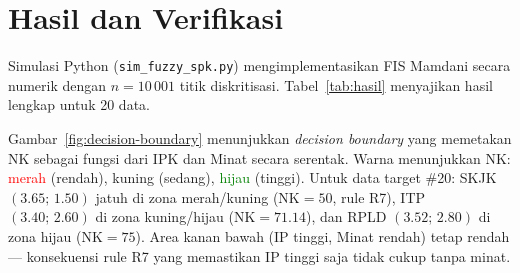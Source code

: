 \documentclass[conference]{IEEEtran}
\begin{document}
\section{Hasil dan Verifikasi}
\label{sec:hasil}

Simulasi Python (\texttt{sim\_fuzzy\_spk.py}) mengimplementasikan FIS
Mamdani secara numerik dengan $n=10\,001$ titik diskritisasi.
Tabel~\ref{tab:hasil} menyajikan hasil lengkap untuk 20 data.

Gambar~\ref{fig:decision-boundary} menunjukkan \emph{decision boundary}
yang memetakan NK sebagai fungsi dari IPK dan Minat secara serentak.
Warna menunjukkan NK: \textcolor{red}{merah} (rendah), kuning (sedang),
\textcolor{green}{hijau} (tinggi). Untuk data target \#20: SKJK
$(3.65;\,1.50)$ jatuh di zona merah/kuning (NK$=50$, rule R7),
ITP $(3.40;\,2.60)$ di zona kuning/hijau (NK$=71.14$), dan RPLD
$(3.52;\,2.80)$ di zona hijau (NK$=75$). Area kanan bawah (IP tinggi,
Minat rendah) tetap rendah --- konsekuensi rule R7 yang memastikan
IP tinggi saja tidak cukup tanpa minat.
\end{document}
